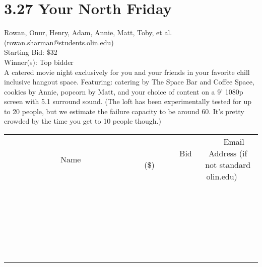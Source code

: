 \documentclass[11pt]{article}
\begin{document}
\section*{3.27 Your North Friday}
Rowan, Onur, Henry, Adam, Annie, Matt, Toby, et al. (rowan.sharman@students.olin.edu) \\
Starting Bid: \$32 \\
Winner(s): 
Top bidder \\
A catered movie night exclusively for you and your friends in your favorite chill inclusive hangout space. Featuring: catering by The Space Bar and Coffee Space, cookies by Annie, popcorn by Matt, and your choice of content on a 9' 1080p screen with 5.1 surround sound.
(The loft has been experimentally tested for up to 20 people, but we estimate the failure capacity to be around 60. It's pretty crowded by the time you get to 10 people though.) \\[6ex]
\begin{tabular}{c c c}
~~~~~~~~~~~~~Name~~~~~~~~~~~~~ & ~~~~~~~~~Bid (\$)~~~~~~~~~ & ~~~Email Address (if not standard olin.edu)~~~ \\
 & & \\
\hline
 & & \\
\hline
 & & \\
\hline
 & & \\
\hline
 & & \\
\hline
 & & \\
\hline
 & & \\
\hline
 & & \\
\hline
 & & \\
\hline
 & & \\
\hline
 & & \\
\hline
 & & \\
\hline
 & & \\
\hline
 & & \\
\hline
 & & \\
\hline
 & & \\
\hline
 & & \\
\hline
 & & \\
\hline
 & & \\
\hline
 & & \\
\hline
 & & \\
\hline
 & & \\
\hline
 & & \\
\hline
 & & \\
\hline
 & & \\
\hline
 & & \\
\hline
\end{tabular}
\clearpage
\end{document}
